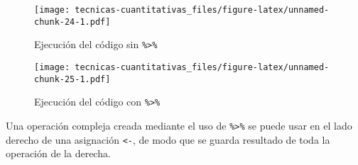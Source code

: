 \documentclass[
]{book}
\newenvironment{Shaded}{\begin{snugshade}}{\end{snugshade}}
\newcommand{\CommentTok}[1]{\textcolor[rgb]{0.56,0.35,0.01}{\textit{#1}}}
\newcommand{\DataTypeTok}[1]{\textcolor[rgb]{0.13,0.29,0.53}{#1}}
\newcommand{\DecValTok}[1]{\textcolor[rgb]{0.00,0.00,0.81}{#1}}
\newcommand{\KeywordTok}[1]{\textcolor[rgb]{0.13,0.29,0.53}{\textbf{#1}}}
\newcommand{\NormalTok}[1]{#1}
\newcommand{\OperatorTok}[1]{\textcolor[rgb]{0.81,0.36,0.00}{\textbf{#1}}}
\newcommand{\StringTok}[1]{\textcolor[rgb]{0.31,0.60,0.02}{#1}}
\begin{document}
\begin{Shaded}
\end{Shaded}

\begin{figure}
\centering
\texttt{[image: tecnicas-cuantitativas\_files/figure-latex/unnamed-chunk-24-1.pdf]}
\caption{\label{fig:unnamed-chunk-24}Ejecución del código sin \texttt{\%\textgreater{}\%}}
\end{figure}

\begin{figure}
\centering
\texttt{[image: tecnicas-cuantitativas\_files/figure-latex/unnamed-chunk-25-1.pdf]}
\caption{\label{fig:unnamed-chunk-25}Ejecución del código con \texttt{\%\textgreater{}\%}}
\end{figure}

Una operación compleja creada mediante el uso de \texttt{\%\textgreater{}\%} se puede usar en el lado derecho de una asignación \texttt{\textless{}-}, de modo que se guarda resultado de toda la operación de la derecha.
\end{document}
